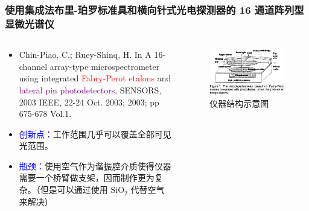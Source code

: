 \begin{frame}[c]
    \frametitle{使用集成法布里-珀罗标准具和横向针式光电探测器的 16 通道阵列型显微光谱仪}
    \begin{columns}
        \begin{column}{.5\textwidth}
            \begin{itemize}
                \item Chin-Piao, C.; Ruey-Shinq, H. In A 16-channel array-type microspectrometer using integrated \textcolor{red}{Fabry-Perot etalons} and \textcolor{purple}{lateral pin photodetectors}, SENSORS, 2003 IEEE, 22-24 Oct. 2003; 2003; pp 675-678 Vol.1.
                \item \textcolor{blue}{创新点：}工作范围几乎可以覆盖全部可见光范围。
                \item \textcolor{blue}{瓶颈：}使用空气作为谐振腔介质使得仪器需要一个桥臂做支架，因而制作更为复杂。（但是可以通过使用 $\mathrm{SiO}_2$ 代替空气来解决）
            \end{itemize}
        \end{column}
        \begin{column}{.5\textwidth}
            \begin{figure}[H] %
                \centering %
                \includegraphics[width=.9\textwidth]{figures/A 16-channel array-type microspectrometer using integrated Fabry-Perot etalons and lateral pin photodetectors_1.png} %
                \caption{仪器结构示意图} %
            \end{figure}
            \begin{figure}[H] %
                \centering %

\end{figure}
\end{column}
\end{columns}
\end{frame}
